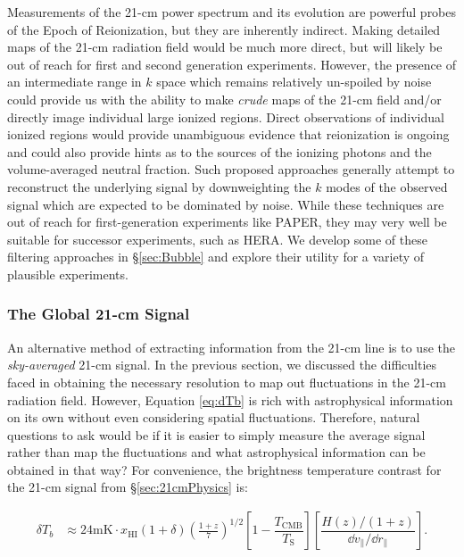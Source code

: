 Measurements of the 21-cm power spectrum and its evolution are powerful probes of the Epoch of Reionization, but they are inherently indirect. Making detailed maps of the 21-cm radiation field would be much more direct, but will likely be out of reach for first and second generation experiments. However, the presence of an intermediate range in $k$ space which remains relatively un-spoiled by noise could provide us with the ability to make \textit{crude} maps of the 21-cm field and/or directly image individual large ionized regions. Direct observations of individual ionized regions would provide unambiguous evidence that reionization is ongoing and could also provide hints as to the sources of the ionizing photons and the volume-averaged neutral fraction. Such proposed approaches generally attempt to reconstruct the underlying signal by downweighting the $k$ modes of the observed signal which are expected to be dominated by noise. While these techniques are out of reach for first-generation experiments like PAPER, they may very well be suitable for successor experiments, such as HERA. We develop some of these filtering approaches in \S \ref{sec:Bubble} and explore their utility for a variety of plausible experiments.


\subsubsection{The Global 21-cm Signal}\label{sec:Global21cm}

An alternative method of extracting information from the 21-cm line is to use the \textit{sky-averaged} 21-cm signal. In the previous section, we discussed the difficulties faced in obtaining the necessary resolution to map out fluctuations in the 21-cm radiation field. However, Equation \ref{eq:dTb} is rich with astrophysical information on its own without even considering spatial fluctuations. Therefore, natural questions to ask would be if it is easier to simply measure the average signal rather than map the fluctuations and what astrophysical information can be obtained in that way? For convenience, the brightness temperature contrast for the 21-cm signal from \S \ref{sec:21cmPhysics} is:

\begin{align}
\delta T_{b} &\approx 24 \text{mK}\cdot x_{\text{HI}}(1+\delta)\left(\frac{1+z}{7}\right)^{1/2}\left[ 1 - \dfrac{T_{\text{CMB}}}{T_{\text{S}}} \right] \left[ \dfrac{H(z)/(1+z)}{\dd v_{\parallel}/ \dd r_{\parallel}} \right].
\end{align}

